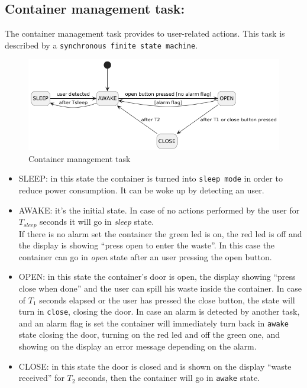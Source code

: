 \documentclass[a4paper,12pt]{report}
\begin{document}
        \subsection{Container management task:}

            The container management task provides to user-related actions.
            This task is described by a \texttt{synchronous finite state machine}. 

            \begin{figure}[H]
        	\centering{}
                \includegraphics[width=\textwidth]{img/container_task.png}
        	\caption{Container management task}
        	\label{img:container_task}
            \end{figure}

            
            \begin{itemize}
                \item SLEEP: in this state the container is turned into \texttt{sleep mode} in order to reduce power consumption. It can be woke up by detecting an user.
                \item AWAKE: it's the initial state. In case of no actions performed by the user for $T_{sleep}$ seconds it will go in \textit{sleep} state. \\
                If there is no alarm set the container the green led is on, the red led is off and the display is showing ``press open to enter the waste''. In this case the container can go in \textit{open} state after an user pressing the open button.
                \item OPEN: in this state the container's door is open, the display showing ``press close when done'' and the user can spill his waste inside the container. In case of $T_1$ seconds elapsed or the user has pressed the close button, the state will turn in \texttt{close}, closing the door.
                In case an alarm is detected by another task, and an alarm flag is set the container will immediately turn back in \texttt{awake} state closing the door, turning on the red led and off the green one, and showing on the display an error message depending on the alarm.
                \item CLOSE: in this state the door is closed and is shown on the display ``waste received'' for $T_2$ seconds, then the container will go in \texttt{awake} state. 
            \end{itemize}
\end{document}
